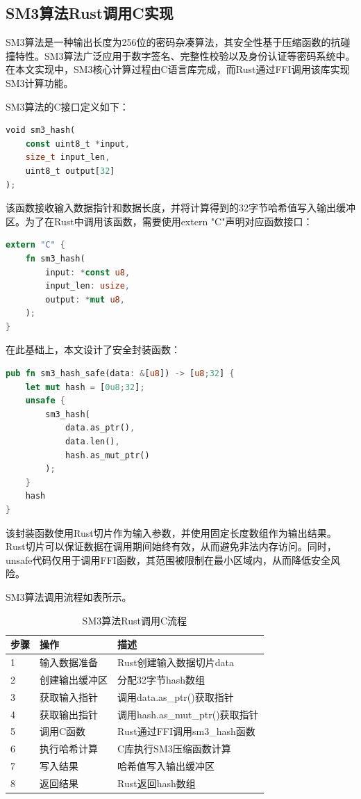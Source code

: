 \subsection{SM3算法Rust调用C实现}

SM3算法是一种输出长度为256位的密码杂凑算法，其安全性基于压缩函数的抗碰撞特性。SM3算法广泛应用于数字签名、完整性校验以及身份认证等密码系统中。在本文实现中，SM3核心计算过程由C语言库完成，而Rust通过FFI调用该库实现SM3计算功能。

SM3算法的C接口定义如下：

\begin{lstlisting}[language=Rust, caption={sm3hash}]
void sm3_hash(
    const uint8_t *input,
    size_t input_len,
    uint8_t output[32]
);
\end{lstlisting}

该函数接收输入数据指针和数据长度，并将计算得到的32字节哈希值写入输出缓冲区。为了在Rust中调用该函数，需要使用extern "C"声明对应函数接口：

\begin{lstlisting}[language=Rust, caption={sm3hash}]
extern "C" {
    fn sm3_hash(
        input: *const u8,
        input_len: usize,
        output: *mut u8,
    );
}
\end{lstlisting}

在此基础上，本文设计了安全封装函数：

\begin{lstlisting}[language=Rust, caption={sm3hash}]
pub fn sm3_hash_safe(data: &[u8]) -> [u8;32] {
    let mut hash = [0u8;32];
    unsafe {
        sm3_hash(
            data.as_ptr(),
            data.len(),
            hash.as_mut_ptr()
        );
    }
    hash
}
\end{lstlisting}

该封装函数使用Rust切片作为输入参数，并使用固定长度数组作为输出结果。Rust切片可以保证数据在调用期间始终有效，从而避免非法内存访问。同时，unsafe代码仅用于调用FFI函数，其范围被限制在最小区域内，从而降低安全风险。

SM3算法调用流程如表所示。

\begin{table}[H]
\centering
\caption{SM3算法Rust调用C流程}
\begin{tabular}{lll}
\toprule
步骤 & 操作 & 描述 \\
\midrule
1 & 输入数据准备 & Rust创建输入数据切片data \\
2 & 创建输出缓冲区 & 分配32字节hash数组 \\
3 & 获取输入指针 & 调用data.as\_ptr()获取指针 \\
4 & 获取输出指针 & 调用hash.as\_mut\_ptr()获取指针 \\
5 & 调用C函数 & Rust通过FFI调用sm3\_hash函数 \\
6 & 执行哈希计算 & C库执行SM3压缩函数计算 \\
7 & 写入结果 & 哈希值写入输出缓冲区 \\
8 & 返回结果 & Rust返回hash数组 \\
\bottomrule
\end{tabular}
\end{table}

